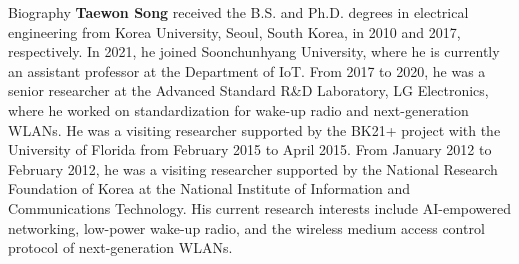 \begin{rubric}{Biography}
\entry*[]%
\textbf{Taewon Song} received the B.S. and Ph.D. degrees in electrical engineering from Korea University, Seoul, South Korea, in 2010 and 2017, respectively. In 2021, he joined Soonchunhyang University, where he is currently an assistant professor at the Department of IoT. From 2017 to 2020, he was a senior researcher at the Advanced Standard R\&D Laboratory, LG Electronics, where he worked on standardization for wake-up radio and next-generation WLANs. He was a visiting researcher supported by the BK21+ project with the University of Florida from February 2015 to April 2015. From January 2012 to February 2012, he was a visiting researcher supported by the National Research Foundation of Korea at the National Institute of Information and Communications Technology. His current research interests include AI-empowered networking, low-power wake-up radio, and the wireless medium access control protocol of next-generation WLANs.
 
%
\end{rubric}